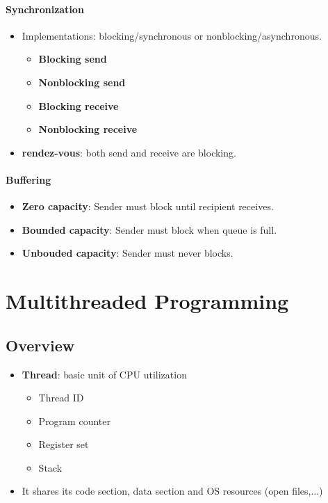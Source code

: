 \documentclass[10pt]{report}
\begin{document}
			\subsubsection{Synchronization}
				\begin{itemize}
					\item Implementations: blocking/synchronous or nonblocking/asynchronous.
					\begin{itemize}
						\item \textbf{Blocking send}
						\item \textbf{Nonblocking send}
						\item \textbf{Blocking receive}
						\item \textbf{Nonblocking receive}
					\end{itemize}
					\item \textbf{rendez-vous}: both send and receive are blocking.
				\end{itemize}

			\subsubsection{Buffering}
				\begin{itemize}
					\item \textbf{Zero capacity}: Sender must block until recipient receives.
					\item \textbf{Bounded capacity}: Sender must block when queue is full.
					\item \textbf{Unbouded capacity}: Sender must never blocks.
				\end{itemize}

\chapter{Multithreaded Programming} \label{ch:Chapter4}
	\section{Overview}
		\begin{itemize}
			\item \textbf{Thread}: basic unit of CPU utilization
			\begin{itemize}
				\item Thread ID
				\item Program counter
				\item Register set
				\item Stack
			\end{itemize}
			\item It shares its code section, data section and OS resources (open files,...)
		\end{itemize}
\end{document}
